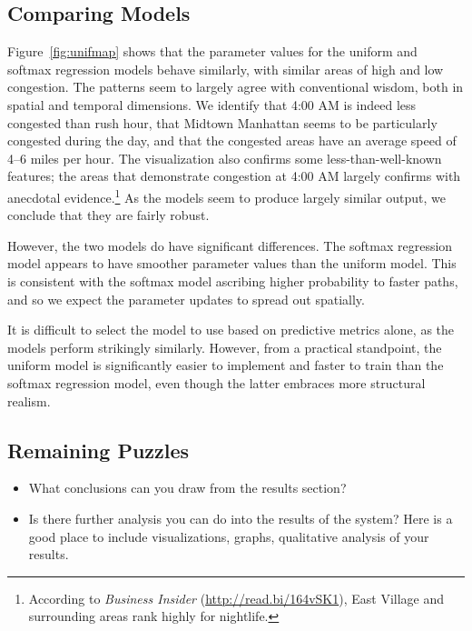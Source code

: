 \documentclass{article}
\begin{document}
\subsection{Comparing Models}

Figure~\ref{fig:unifmap} shows that the parameter values for the uniform and softmax regression models behave similarly, with similar areas of high and low congestion. The patterns seem to largely agree with conventional wisdom, both in spatial and temporal dimensions. We identify that 4:00 AM is indeed less congested than rush hour, that Midtown Manhattan seems to be particularly congested during the day, and that the congested areas have an average speed of 4--6 miles per hour. The visualization also confirms some less-than-well-known features; the areas that demonstrate congestion at 4:00 AM largely confirms with anecdotal evidence.\footnote{According to \textit{Business Insider} (\url{http://read.bi/164vSK1}), East Village and surrounding areas rank highly for nightlife. %
} As the models seem to produce largely similar output, we conclude that they are fairly robust.

However, the two models do have significant differences. The softmax regression model appears to have smoother parameter values than the uniform model. This is consistent with the softmax model ascribing higher probability to faster paths, and so we expect the parameter updates to spread out spatially.

It is difficult to select the model to use based on predictive metrics alone, as the models perform strikingly similarly. However, from a practical standpoint, the uniform model is significantly easier to implement and faster to train than the softmax regression model, even though the latter embraces more structural realism. 




\subsection{Remaining Puzzles}

% 


\begin{itemize}
\item What conclusions can you draw from the results section?
\item Is there further analysis you can do into the results of the system? Here is a good place to include visualizations, graphs, qualitative analysis of your results.

\end{itemize}
\end{document}
